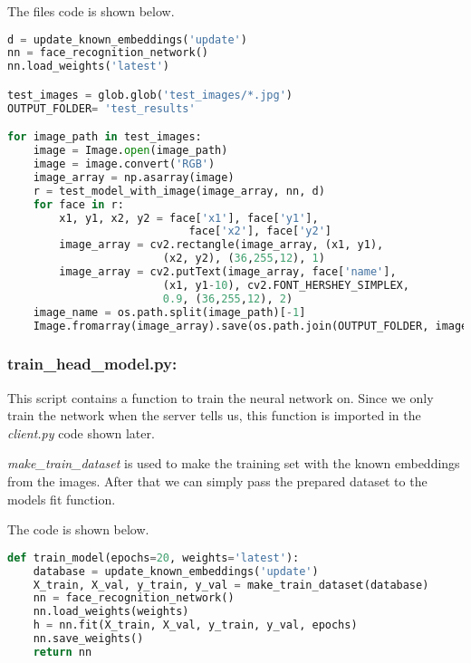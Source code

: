 The files code is shown below.

\begin{center}{\begin{minipage}{0.9\linewidth}
\begin{lstlisting}[language=Python, basicstyle=\fontsize{10}{10}\selectfont\ttfamily]
d = update_known_embeddings('update')
nn = face_recognition_network()
nn.load_weights('latest')

test_images = glob.glob('test_images/*.jpg')
OUTPUT_FOLDER= 'test_results'

for image_path in test_images:
    image = Image.open(image_path)
    image = image.convert('RGB')
    image_array = np.asarray(image)
    r = test_model_with_image(image_array, nn, d)
    for face in r:
        x1, y1, x2, y2 = face['x1'], face['y1'], 
        					face['x2'], face['y2']
        image_array = cv2.rectangle(image_array, (x1, y1), 
        				(x2, y2), (36,255,12), 1)
        image_array = cv2.putText(image_array, face['name'], 
        				(x1, y1-10), cv2.FONT_HERSHEY_SIMPLEX, 
        				0.9, (36,255,12), 2)
    image_name = os.path.split(image_path)[-1]
    Image.fromarray(image_array).save(os.path.join(OUTPUT_FOLDER, image_name))
\end{lstlisting}
\end{minipage}}\end{center}

\subsubsection*{train\_head\_model.py:} This script contains a function to train the neural network on. Since we only train the network when the server tells us, this function is imported in the \textit{client.py} code shown later.

\textit{make\_train\_dataset} is used to make the training set with the known embeddings from the images. After that we can simply pass the prepared dataset to the models fit function. 

The code is shown below.

\begin{center}{\begin{minipage}{0.9\linewidth}
\begin{lstlisting}[language=Python, basicstyle=\fontsize{10}{10}\selectfont\ttfamily]
def train_model(epochs=20, weights='latest'):
    database = update_known_embeddings('update')
    X_train, X_val, y_train, y_val = make_train_dataset(database)
    nn = face_recognition_network()
    nn.load_weights(weights)
    h = nn.fit(X_train, X_val, y_train, y_val, epochs)
    nn.save_weights()
    return nn
\end{lstlisting}
\end{minipage}}\end{center}

